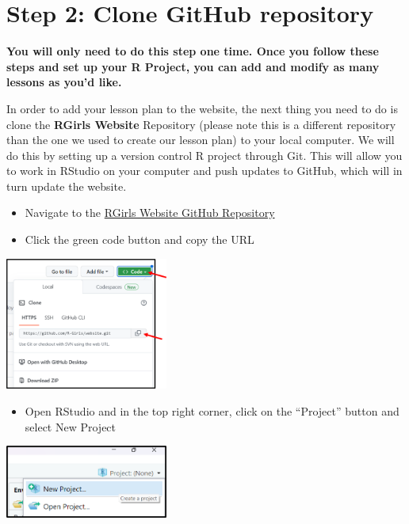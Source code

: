 \documentclass[
]{article}
\providecommand{\tightlist}{%
  \setlength{\itemsep}{0pt}\setlength{\parskip}{0pt}}
\begin{document}
\hypertarget{step-2-clone-github-repository}{%
\section{Step 2: Clone GitHub
repository}\label{step-2-clone-github-repository}}

\textbf{You will only need to do this step one time. Once you follow
these steps and set up your R Project, you can add and modify as many
lessons as you'd like.}

In order to add your lesson plan to the website, the next thing you need
to do is clone the \textbf{RGirls Website} Repository (please note this
is a different repository than the one we used to create our lesson
plan) to your local computer. We will do this by setting up a version
control R project through Git. This will allow you to work in RStudio on
your computer and push updates to GitHub, which will in turn update the
website.

\begin{itemize}
\item
  Navigate to the \href{https://github.com/R-Girls/website}{RGirls
  Website GitHub Repository}
\item
  Click the green code button and copy the URL
\end{itemize}

\includegraphics[width=0.4\textwidth,height=\textheight]{images/guide-img1.png}

\begin{itemize}
\tightlist
\item
  Open RStudio and in the top right corner, click on the ``Project''
  button and select New Project
\end{itemize}

\includegraphics[width=0.4\textwidth,height=\textheight]{images/guide-img2.png}
\end{document}
